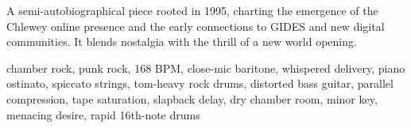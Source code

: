 

\begin{notes}
A semi-autobiographical piece rooted in 1995, charting the emergence of the Chlewey online presence and the early connections to GIDES and new digital communities. %
It blends nostalgia with the thrill of a new world opening.
\end{notes}

\begin{style}
chamber rock, punk rock, 168 BPM, close-mic baritone, whispered delivery, piano ostinato, spiccato strings, tom-heavy rock drums, distorted bass guitar, parallel compression, tape saturation, slapback delay, dry chamber room, minor key, menacing desire, rapid 16th-note drums
\end{style}

